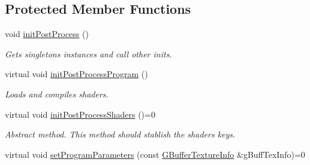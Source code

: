 \subsection*{Protected Member Functions}
\begin{DoxyCompactItemize}
\item 
\mbox{\label{class_geometry_engine_1_1_geometry_post_process_1_1_post_process_a9f680e91835d614dcc942fafe43bd3ae}} 
void \mbox{\hyperlink{class_geometry_engine_1_1_geometry_post_process_1_1_post_process_a9f680e91835d614dcc942fafe43bd3ae}{init\+Post\+Process}} ()
\begin{DoxyCompactList}\small\item\em Gets singletons instances and call other inits. \end{DoxyCompactList}\item 
\mbox{\label{class_geometry_engine_1_1_geometry_post_process_1_1_post_process_a1bd949b51ac91a8630d8df0a4e966afa}} 
virtual void \mbox{\hyperlink{class_geometry_engine_1_1_geometry_post_process_1_1_post_process_a1bd949b51ac91a8630d8df0a4e966afa}{init\+Post\+Process\+Program}} ()
\begin{DoxyCompactList}\small\item\em Loads and compiles shaders. \end{DoxyCompactList}\item 
\mbox{\label{class_geometry_engine_1_1_geometry_post_process_1_1_post_process_a8a478b601f4d3021c33cbc376310e235}} 
virtual void \mbox{\hyperlink{class_geometry_engine_1_1_geometry_post_process_1_1_post_process_a8a478b601f4d3021c33cbc376310e235}{init\+Post\+Process\+Shaders}} ()=0
\begin{DoxyCompactList}\small\item\em Abstract method. This method should stablish the shaders keys. \end{DoxyCompactList}\item 
\mbox{\label{class_geometry_engine_1_1_geometry_post_process_1_1_post_process_ae4bd80f5d0f0768fd4e2141a95ff5bb0}} 
virtual void \mbox{\hyperlink{class_geometry_engine_1_1_geometry_post_process_1_1_post_process_ae4bd80f5d0f0768fd4e2141a95ff5bb0}{set\+Program\+Parameters}} (const \mbox{\hyperlink{class_geometry_engine_1_1_g_buffer_texture_info}{G\+Buffer\+Texture\+Info}} \&g\+Buff\+Tex\+Info)=0

\end{DoxyCompactItemize}
